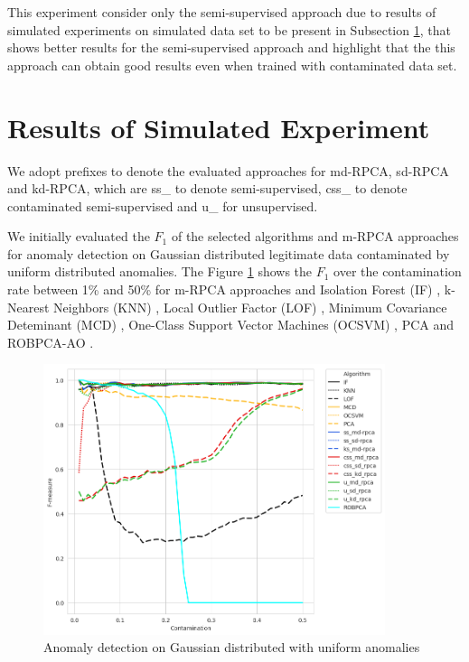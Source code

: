 This experiment consider only the semi-supervised approach due to results of simulated experiments on simulated data set to be present in Subsection \ref{sec:4_simulated_result}, that shows better results for the semi-supervised approach and highlight that the this approach can obtain good results even when trained with contaminated data set.


\section{Results of Simulated Experiment}
\label{sec:4_simulated_result}

We adopt prefixes to denote the evaluated approaches for md-RPCA, sd-RPCA and kd-RPCA, which are ss\_ to denote semi-supervised, css\_ to denote contaminated semi-supervised and u\_ for unsupervised.

We initially evaluated the $F_1$ of the selected algorithms and m-RPCA approaches for anomaly detection on Gaussian distributed legitimate data contaminated by uniform distributed anomalies. The Figure \ref{fig:4.10} shows the $F_1$ over the contamination rate between 1\% and 50\% for m-RPCA approaches and Isolation Forest (IF) \cite{liu2008isolation}, k-Nearest Neighbors (KNN) \cite{angiulli2002fast}, Local Outlier Factor (LOF) \cite{breunig2000lof}, Minimum Covariance Deteminant (MCD) \cite{rousseeuw1999fastmcd}, One-Class Support Vector Machines (OCSVM) \cite{scholkopf2001estimating}, PCA \cite{shyu2003novel} and ROBPCA-AO \cite{hubert2009robustskewed}.

\begin{figure}[h!]
	\centering
	\includegraphics[width=10cm]{figures/ch4/gaussian_f1_contamination.png}
	\caption{Anomaly detection on Gaussian distributed with uniform anomalies}
	\label{fig:4.10}
\end{figure}

